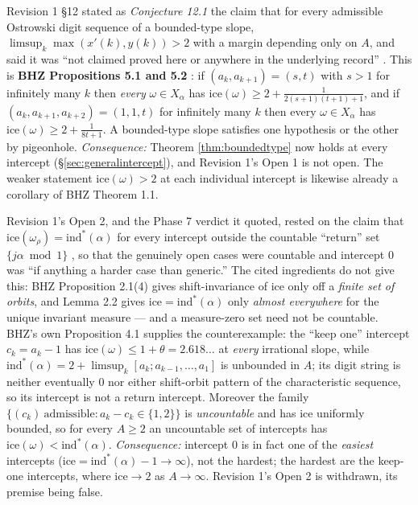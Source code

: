 \documentclass[11pt]{article}
\begin{document}
\begin{description}[leftmargin=2.5em,style=nextline]

\item[C1 --- The ``one remaining lemma'' is a published theorem.] Revision 1 \S12 stated as
\emph{Conjecture 12.1} the claim that for every admissible Ostrowski digit sequence of a
bounded-type slope, $\limsup_k\max(x'(k),y(k))>2$ with a margin depending only on $A$, and said it
was ``not claimed proved here or anywhere in the underlying record'' \cite{Phase7Sufficient,Phase7Verdict}. This is \textbf{BHZ
Propositions 5.1 and 5.2} \cite{BHZ2006}: if $(a_k,a_{k+1})=(s,t)$ with $s>1$ for infinitely many
$k$ then \emph{every} $\omega\in X_\alpha$ has $\text{ice}(\omega)\ge2+\frac1{2(s+1)(t+1)+1}$, and if
$(a_k,a_{k+1},a_{k+2})=(1,1,t)$ for infinitely many $k$ then every $\omega\in X_\alpha$ has
$\text{ice}(\omega)\ge2+\frac1{8t+1}$. A bounded-type slope satisfies one hypothesis or the other by
pigeonhole. \emph{Consequence:} Theorem \ref{thm:boundedtype} now holds at every intercept
(\S\ref{sec:generalintercept}), and Revision 1's Open 1 is not open. The weaker statement
$\text{ice}(\omega)>2$ at each individual intercept is likewise already a corollary of BHZ
Theorem 1.1.

\item[C2 --- The ``exceptional-orbit reduction'' is false.] Revision 1's Open 2, and the Phase 7
verdict it quoted, rested on the claim that $\text{ice}(\omega_\rho)=\text{ind}^*(\alpha)$ for every
intercept outside the countable ``return'' set $\{j\alpha\bmod1\}$ \cite{BHZGeneralMap}, so that the genuinely open cases
were countable and intercept $0$ was ``if anything a harder case than generic.'' The cited
ingredients do not give this: BHZ Proposition 2.1(4) gives shift-invariance of $\text{ice}$ only off
a \emph{finite set of orbits}, and Lemma 2.2 gives $\text{ice}=\text{ind}^*(\alpha)$ only
\emph{almost everywhere} for the unique invariant measure --- and a measure-zero set need not be
countable. BHZ's own Proposition 4.1 supplies the counterexample: the ``keep one'' intercept
$c_k=a_k-1$ has $\text{ice}(\omega)\le1+\theta=2.618\ldots$ at \emph{every} irrational slope, while
$\text{ind}^*(\alpha)=2+\limsup_k[a_k;a_{k-1},\dots,a_1]$ is unbounded in $A$; its digit string is
neither eventually $0$ nor either shift-orbit pattern of the characteristic sequence, so its
intercept is not a return intercept. Moreover the family
$\{(c_k)\ \text{admissible}: a_k-c_k\in\{1,2\}\}$ is \emph{uncountable} and has $\text{ice}$
uniformly bounded, so for every $A\ge2$ an uncountable set of intercepts has
$\text{ice}(\omega)<\text{ind}^*(\alpha)$. \emph{Consequence:} intercept $0$ is in fact one of the
\emph{easiest} intercepts ($\text{ice}=\text{ind}^*(\alpha)-1\to\infty$), not the hardest; the
hardest are the keep-one intercepts, where $\text{ice}\to2$ as $A\to\infty$. Revision 1's Open 2 is
withdrawn, its premise being false.


\end{description}
\end{document}
